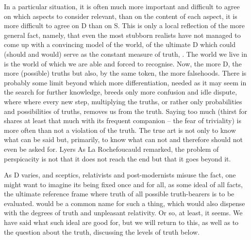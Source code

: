 In a particular situation, it is often much more important and difficult to
agree on which aspects to consider relevant, than on the content of each aspect,
it is more difficult to agree on D than on S. This is only a local reflection of
the more general fact, namely, that even the most stubborn realists have not
managed to come up with a convincing model of the world, of the ultimate D which could
(should and would) serve as the constant measure of truth,
. The world we live in is the world of 
which we are able and forced to recognise. %
Now, the more  D, the more (possible) truths but
also, by the same token, the more falsehoods.  There is probably some limit beyond
which more differentiation, needed as it may seem in the search for further
knowledge, breeds only more confusion and idle dispute, where  where every new step,
multiplying the truths, or rather only probabilities and possibilities of
truths, removes us from the truth. Saying too much (thirst for 
shares at least that much with its frequent companion -- the fear of triviality)
is more often than not a violation of the truth. The true art is not only to
know what can be said but, primarily, to know what can not and therefore should
not even be asked for. \citet{And it is no easie matter, being in the midst of
  the cariere of a discourse, to stop cunningly, to make sudden period, and to
  cut it off. And there is nothing whereby the cleane strenght of a horse is
  more knowne, than to make a readie and cleane stop.}{Lyers}{} As La
Rochefoucauld remarked, 
the problem of perspicacity is not that it does not reach the end but that it
goes beyond it.



As D varies, and sceptics, relativists and post-modernists misuse the fact, one
might want to 
imagine its being fixed once and for all, as some ideal
 of all facts, the ultimate reference frame where truth of all
possible truth-bearers is to be evaluated.  would be a common name
for such a thing, which would also dispense with the degrees of truth and
unpleasant relativity. Or so, at least, it seems. We have said what such ideal
 are good for, but we will return to this, as well as to the
question about the  truth, discussing the levels of truth below. 


